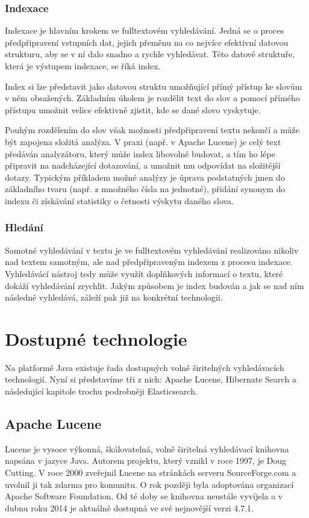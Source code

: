\documentclass[11pt,draft,oneside]{fithesis2}
\begin{document}
\subsection{Indexace}
Indexace je hlavním krokem ve fulltextovém vyhledávání. Jedná se o proces předpřipravení vstupních dat, jejich přeměnu na co nejvíce efektivní datovou strukturu, aby se v ní dalo snadno a rychle vyhledávat. 
Této datové struktuře, která je výstupem indexace, se říká index. 

Index si lze představit jako datovou struktu umožňující přímý přístup ke slovům v něm obsažených. Základním úkolem je rozdělit text do slov a pomocí přímého přístupu umožnit velice efektivně zjistit,
kde se dané slovo vyskytuje.

Pouhým rozdělením do slov však možnosti předpřipravení textu nekončí a může být zapojena složitá analýza. V praxi (např. v Apache Lucene) je celý text předáván analyzátoru, který může index libovolně budovat, a tím ho lépe připravit na nadcházející dotazování, a umožnit mu odpovídat na složitější dotazy. Typickým příkladem možné analýzy 
je úprava podstatných jmen do základního tvaru (např. z množného čísla na jednotné), přidání synonym do indexu či získávání statistiky o četnosti výskytu daného slova.

\subsection{Hledání}
Samotné vyhledávání v textu je ve fulltextovém vyhledávání realizováno nikoliv nad textem samotným, ale nad předpřipraveným indexem z procesu indexace. Vyhledávácí nástroj tedy může využít doplňkových informací o textu, které dokáží vyhledávání zrychlit. Jakým způsobem je index budován a jak se nad ním následně vyhledává, záleží pak již na konkrétní technologii.

\chapter{Dostupné technologie}
Na platformě Java existuje řada dostupných volně širitelných vyhledávacích technologií. Nyní si představíme tři z nich: Apache Lucene, Hibernate Search a následující kapitole trochu podrobněji Elasticsearch.

\section{Apache Lucene}
Lucene je vysoce výkonná, škálovatelná, volně širitelná vyhledávací knihovna napsána v jazyce Java. Autorem projektu, který vznikl v roce 1997, je Doug Cutting. V roce 2000 zveřejnil Lucene na stránkách serveru SourceForge.com a uvolnil ji tak zdarma
pro komunitu. O rok později byla adoptována organizací Apache Software Foundation. Od té doby se knihovna neustále vyvíjela a v dubnu roku 2014 je aktuálně dostupná ve své nejnovější verzi 4.7.1.
\end{document}

